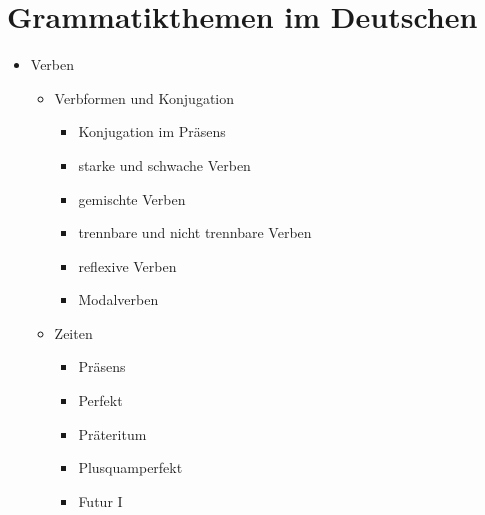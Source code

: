 \documentclass[a4paper]{article}
\title{}
\date{}
\begin{document}
    \maketitle
    
    
    \section{Grammatikthemen im Deutschen}
        
        \begin{itemize}
            \item Verben
            \begin{itemize}
                \item Verbformen und Konjugation
                \begin{itemize}
                    \item Konjugation im Präsens
                    \item starke und schwache Verben
                    \item gemischte Verben
                    \item trennbare und nicht trennbare Verben
                    \item reflexive Verben
                    \item Modalverben
                \end{itemize}
                
                \item Zeiten
                \begin{itemize}
                    \item Präsens
                    \item Perfekt
                    \item Präteritum
                    \item Plusquamperfekt
                    \item Futur I
                \end{itemize}
                

\end{itemize}
\end{itemize}
\end{document}
